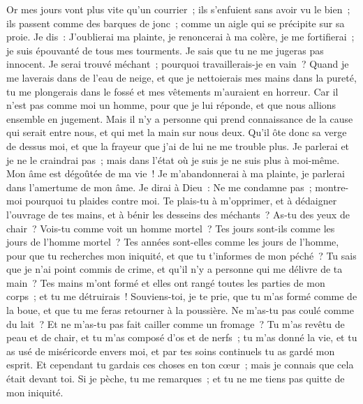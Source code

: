 \begin{multicols}{2}
Or mes jours vont plus vite qu'un courrier~; ils s'enfuient sans avoir vu le bien~;
ils passent comme des barques de jonc~; comme un aigle qui se précipite sur sa proie.
Je dis~: J'oublierai ma plainte, je renoncerai à ma colère, je me fortifierai~; 
je suis épouvanté de tous mes tourments. Je sais que tu ne me jugeras pas innocent.
Je serai trouvé méchant~; pourquoi travaillerais-je en vain~?
Quand je me laverais dans de l'eau de neige, et que je nettoierais mes mains dans la pureté, 
tu me plongerais dans le fossé et mes vêtements m'auraient en horreur.
Car il n'est pas comme moi un homme, pour que je lui réponde, et que nous allions ensemble en jugement.
Mais il n'y a personne qui prend connaissance de la cause qui serait entre nous, et qui met la main sur nous deux.
Qu'il ôte donc sa verge de dessus moi, et que la frayeur que j'ai de lui ne me trouble plus.
Je parlerai et je ne le craindrai pas~; mais dans l'état où je suis je ne suis plus à moi-même. 
\VerseOne{}Mon âme est dégoûtée de ma vie~! Je m'abandonnerai à ma plainte, je parlerai dans l'amertume de mon âme.
Je dirai à Dieu~: Ne me condamne pas~; montre-moi pourquoi tu plaides contre moi.
Te plais-tu à m'opprimer, et à dédaigner l'ouvrage de tes mains, et à bénir les desseins des méchants~?
As-tu des yeux de chair~? Vois-tu comme voit un homme mortel~?
Tes jours sont-ils comme les jours de l'homme mortel~? Tes années sont-elles comme les jours de l'homme, 
pour que tu recherches mon iniquité, et que tu t'informes de mon péché~?
Tu sais que je n'ai point commis de crime, et qu'il n'y a personne qui me délivre de ta main~?
Tes mains m'ont formé et elles ont rangé toutes les parties de mon corps~; et tu me détruirais~!
Souviens-toi, je te prie, que tu m'as formé comme de la boue, et que tu me feras retourner à la poussière. 
Ne m'as-tu pas coulé comme du lait~? Et ne m'as-tu pas fait cailler comme un fromage~?
Tu m'as revêtu de peau et de chair, et tu m'as composé d'os et de nerfs~;
tu m'as donné la vie, et tu as usé de miséricorde envers moi, et par tes soins continuels tu as gardé mon esprit.
Et cependant tu gardais ces choses en ton cœur~; mais je connais que cela était devant toi. 
Si je pèche, tu me remarques~; et tu ne me tiens pas quitte de mon iniquité.

\end{multicols}
